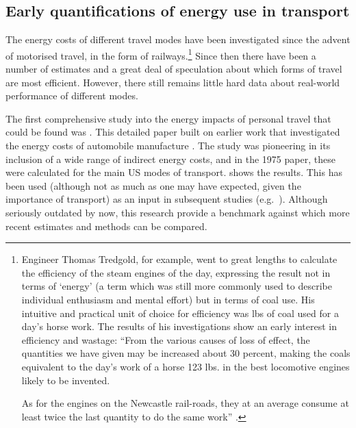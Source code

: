 \subsection{Early quantifications of energy use in transport}
The energy costs of different travel modes have been investigated since the
advent of motorised travel, in the form of
railways.\footnote{Engineer Thomas Tredgold, for example,
went to great
lengths to calculate the efficiency of the steam engines of the day, expressing
the result not in terms of `energy' (a term which was still more commonly
used to describe individual enthusiasm and mental effort) but in terms of
coal use. His intuitive and practical unit of choice for efficiency
was lbs of coal used for a day's horse work.
The results of his investigations show an early interest in
efficiency and wastage:
``From the various causes of loss of effect, the quantities we have given
may be increased about 30 percent, making the coals equivalent to the
day's work of a horse 123 lbs. in the best locomotive engines likely to be
invented.

As for the engines on the Newcastle rail-roads, they at an average consume
at least twice the last quantity to do the same work''
\citep[p.~82]{tredgold1835practical}.
}
Since then there have been
a number of estimates and a great deal of speculation about which forms of
travel are most efficient. However, there still remains little hard data
about real-world performance of different modes.

The first comprehensive study into the energy impacts of personal travel
that could be found was \citet{Fels1975}. This detailed paper built on earlier
work that investigated the energy costs of automobile manufacture
\citep{Fels1973}. The study was pioneering
in its inclusion of a wide range of indirect energy costs, and in the 1975
paper, these were calculated for the main US modes of transport. 
shows the results. This has been used (although not as much as one may have
expected, given the importance of transport) as an input in subsequent
studies (e.g.~\citealp{Fels-referal-1985}). Although seriously outdated by
now, this research provide a benchmark against which more recent estimates
and methods can be compared.

